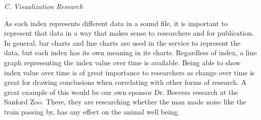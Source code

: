 \begin{flushleft}
\noindent\textit{C. Visualization Research}\par
As each index represents different data in a sound file, it is important to represent that data in a way that makes sense to researchers and for publication. In general, bar charts and line charts are used in the service to represent the data, but each index has its own meaning in its charts. Regardless of index, a line graph representing the index value over time is available. Being able to show index value over time is of great importance to researchers as change over time is great for drawing conclusions when correlating with other forms of research. A great example of this would be our own sponsor Dr. Beever\textquotesingle s research at the Sanford Zoo. There, they are researching whether the man made noise like the train passing by, has any effect on the animal well being.

\end{flushleft}
